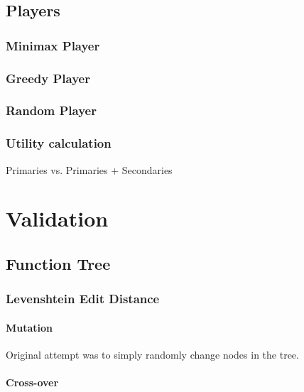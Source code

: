 \documentclass{acm_proc_article-sp}
\begin{document}
    

    \subsection{Players}

        \subsubsection{Minimax Player}
    
        \subsubsection{Greedy Player}
    
        \subsubsection{Random Player}

        \subsubsection{Utility calculation}
        
            Primaries vs. Primaries + Secondaries
            
\section{Validation}

    \subsection{Function Tree}
    
        \subsubsection{Levenshtein Edit Distance}
        
            \paragraph{Mutation}
            
            Original attempt was to simply randomly change nodes in the tree.
            
            \paragraph{Cross-over}
            
\end{document}

